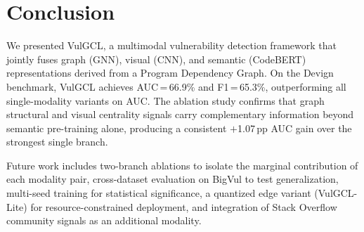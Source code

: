 \section{Conclusion}
\label{sec:conclusion}

We presented VulGCL, a multimodal vulnerability detection framework that
jointly fuses graph (GNN), visual (CNN), and semantic (CodeBERT) representations
derived from a Program Dependency Graph. On the Devign benchmark, VulGCL achieves
AUC\,=\,66.9\% and F1\,=\,65.3\%, outperforming all single-modality variants on
AUC. The ablation study confirms that graph structural and visual centrality
signals carry complementary information beyond semantic pre-training alone,
producing a consistent $+$1.07\,pp AUC gain over the strongest single branch.

Future work includes two-branch ablations to isolate the marginal contribution of
each modality pair, cross-dataset evaluation on BigVul to test generalization,
multi-seed training for statistical significance, a quantized edge variant
(VulGCL-Lite) for resource-constrained deployment, and integration of Stack
Overflow community signals as an additional modality.
